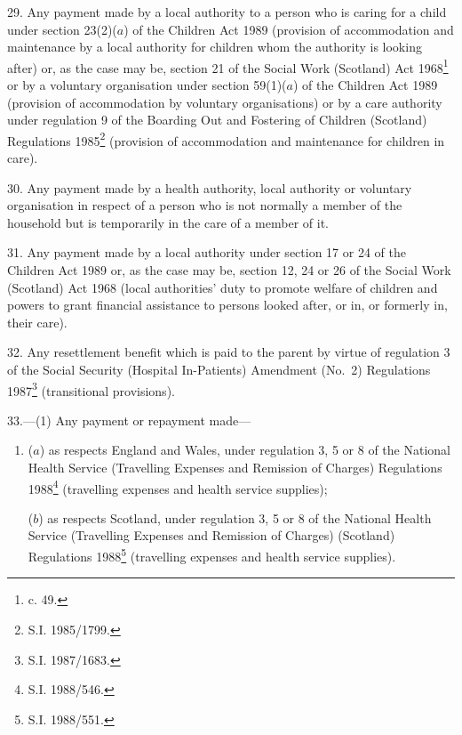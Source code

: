 \documentclass[12pt,a4paper]{article}
\begin{document}
29.  Any payment made by a local authority to a person who is caring for a child under section 23(2)($a$) of the Children Act 1989 (provision of accommodation and maintenance by a local authority for children whom the authority is looking after) or, as the case may be, section 21 of the Social Work (Scotland) Act 1968\footnote{ c. 49.} or by a voluntary organisation under section 59(1)($a$) of the Children Act 1989 (provision of accommodation by voluntary organisations) or by a care authority under regulation 9 of the Boarding Out and Fostering of Children (Scotland) Regulations 1985\footnote{\frenchspacing S.I. 1985/1799.} (provision of accommodation and maintenance for children in care).

\medskip

30.  Any payment made by a health authority, local authority or voluntary organisation in respect of a person who is not normally a member of the household but is temporarily in the care of a member of it.

\medskip

31.  Any payment made by a local authority under section 17 or 24 of the Children Act 1989 or, as the case may be, section 12, 24 or 26 of the Social Work (Scotland) Act 1968 (local authorities' duty to promote welfare of children and powers to grant financial assistance to persons looked after, or in, or formerly in, their care).

\medskip

32.  Any resettlement benefit which is paid to the parent by virtue of regulation 3 of the Social Security (Hospital In-Patients) Amendment (No.\ 2) Regulations 1987\footnote{\frenchspacing S.I. 1987/1683.} (transitional provisions).

\medskip

33.—(1) Any payment or repayment made—
\begin{enumerate}\item[]
($a$) as respects England and Wales, under regulation 3, 5 or 8 of the National Health Service (Travelling Expenses and Remission of Charges) Regulations 1988\footnote{\frenchspacing S.I. 1988/546.} (travelling expenses and health service supplies);

($b$) as respects Scotland, under regulation 3, 5 or 8 of the National Health Service (Travelling Expenses and Remission of Charges) (Scotland) Regulations 1988\footnote{\frenchspacing S.I. 1988/551.} (travelling expenses and health service supplies).
\end{enumerate}
\end{document}
